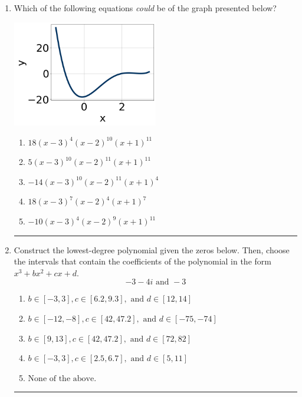 \documentclass[14pt]{extbook}
\newcommand{\litem}[1]{\item#1\hspace*{-1cm}\rule{\textwidth}{0.4pt}}
\begin{document}
\begin{enumerate}
{\begin{enumerate}[label=\Alph*.]
\end{enumerate} }
\litem{
Which of the following equations \textit{could} be of the graph presented below?
\begin{center}
    \includegraphics[width=0.5\textwidth]{../Figures/polyGraphToFunctionCopyB.png}
\end{center}
\begin{enumerate}[label=\Alph*.]
\item \( 18(x - 3)^{4} (x - 2)^{10} (x + 1)^{11} \)
\item \( 5(x - 3)^{10} (x - 2)^{11} (x + 1)^{11} \)
\item \( -14(x - 3)^{10} (x - 2)^{11} (x + 1)^{4} \)
\item \( 18(x - 3)^{7} (x - 2)^{4} (x + 1)^{7} \)
\item \( -10(x - 3)^{4} (x - 2)^{9} (x + 1)^{11} \)

\end{enumerate} }
\litem{
Construct the lowest-degree polynomial given the zeros below. Then, choose the intervals that contain the coefficients of the polynomial in the form $x^3+bx^2+cx+d$.\[ -3 - 4 i \text{ and } -3 \]\begin{enumerate}[label=\Alph*.]
\item \( b \in [-3, 3], c \in [6.2, 9.3], \text{ and } d \in [12, 14] \)
\item \( b \in [-12, -8], c \in [42, 47.2], \text{ and } d \in [-75, -74] \)
\item \( b \in [9, 13], c \in [42, 47.2], \text{ and } d \in [72, 82] \)
\item \( b \in [-3, 3], c \in [2.5, 6.7], \text{ and } d \in [5, 11] \)
\item \( \text{None of the above.} \)


\end{enumerate}}
\end{enumerate}
\end{document}
